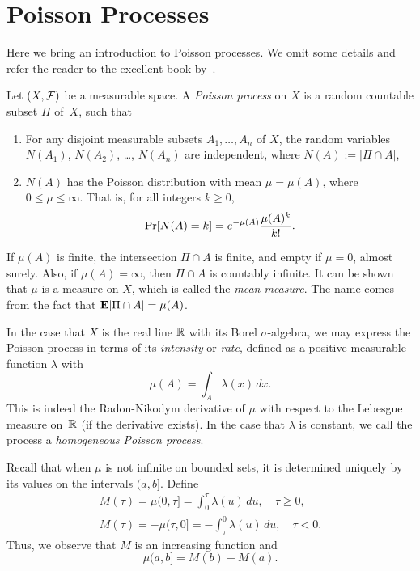 \section{Poisson Processes}\label{sec:poisson}
Here we bring an introduction to Poisson processes. We omit some details and refer the reader to the excellent book by~\citet{kingman1992poisson}. 

Let $(X, \mathcal{F})$ be a measurable space. A \emph{Poisson process} on $X$ is a random countable subset $\Pi$ of~$X$, such that
\begin{enumerate}
    \item For any disjoint measurable subsets $A_1,\ldots, A_n$ of $X$, the random variables $N(A_1)$, $N(A_2)$, \dots, $N(A_n)$ are independent, where $N(A) := |\Pi \cap A|$,
    \item $N(A)$ has the Poisson distribution with mean $\mu = \mu(A)$, where $0\leq \mu \leq \infty$. That is, for all integers $k \geq 0$,
        \[
            \mathop{\mathrm{Pr}}[N(A) = k] = e^{-\mu(A)} \frac{\mu(A)^k}{k!}.
        \]
\end{enumerate}
If $\mu(A)$ is finite, the intersection $\Pi \cap A$ is finite, and empty if $\mu = 0$, almost surely. Also, if $\mu(A) = \infty$, then $\Pi\cap A$ is countably infinite. It can be shown that $\mu$ is a measure on $X$, which is called the \emph{mean measure}. The name comes from the fact that $\mathbf{E}{|\Pi \cap A|} = \mu(A)$.

In the case that $X$ is the real line $\mathbb{R}$ with its Borel $\sigma$-algebra, we may express the Poisson process in terms of its \emph{intensity} or \emph{rate}, defined as a positive measurable function $\lambda$ with
\[
    \mu(A) = \int_A \lambda(x)\,dx.
\]
This is indeed the Radon-Nikodym derivative of $\mu$ with respect to the Lebesgue measure on~$\mathbb{R}$ (if the derivative exists). In the case that $\lambda$ is constant, we call the process a \emph{homogeneous Poisson process}.

Recall that when $\mu$ is not infinite on bounded sets, it is determined uniquely by its values on the intervals $(a, b]$. Define
\begin{align*}
    M(\tau) = \mu(0, \tau] = \int_0^\tau \lambda(u)\, du,\quad \tau \geq 0,\\
    M(\tau) = -\mu(\tau, 0] = -\int_\tau^0 \lambda(u)\, du,\quad \tau < 0.
\end{align*}
Thus, we observe that $M$ is an increasing function and 
\[
    \mu(a, b] = M(b) - M(a).
\] 

